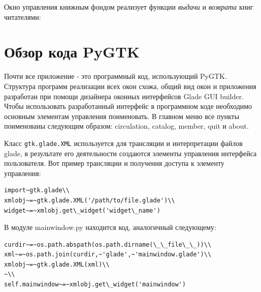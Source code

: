 \documentclass[a4paper,openany,twoside,draft]{book}
\begin{document}
Окно управления книжным фондом реализует функции \emph{выдачи} и \emph{возврата}
книг читателями:

\noindent{}


\section{Обзор кода PyGTK%
  \label{pygtk}%
}

Почти все приложение - это программный код, использующий PyGTK.
Структура программ реализации всех окон схожа, общий вид окон и
приложения разработан при помощи дизайнера оконных интерфейсов Glade
GUI builder.  Чтобы использовать разработанный интерфейс в программном
коде необходимо основным элементам управления поименовать.  В главном
меню все пункты поименованы следующим образом: \textquotedbl{}circulation\textquotedbl{},
\textquotedbl{}catalog\textquotedbl{}, \textquotedbl{}member\textquotedbl{}, \textquotedbl{}quit\textquotedbl{} и \textquotedbl{}about\textquotedbl{}.

Класс \texttt{gtk.glade.XML} используется для трансляции и интерпретации
файлов glade, в результате его деятельности создаются элементы
управления интерфейса пользователя.  Вот пример трансляции и получения
доступа к элементу управления:

\begin{verbatim}
import~gtk.glade\\
xmlobj~=~gtk.glade.XML('/path/to/file.glade')\\
widget~=~xmlobj.get\_widget('widget\_name')
\end{verbatim}

В модуле mainwindow.py находится код, аналогичный следующему:

\begin{verbatim}
curdir~=~os.path.abspath(os.path.dirname(\_\_file\_\_))\\
xml~=~os.path.join(curdir,~'glade',~'mainwindow.glade')\\
xmlobj~=~gtk.glade.XML(xml)\\
~\\
self.mainwindow~=~xmlobj.get\_widget('mainwindow')
\end{verbatim}
\end{document}
